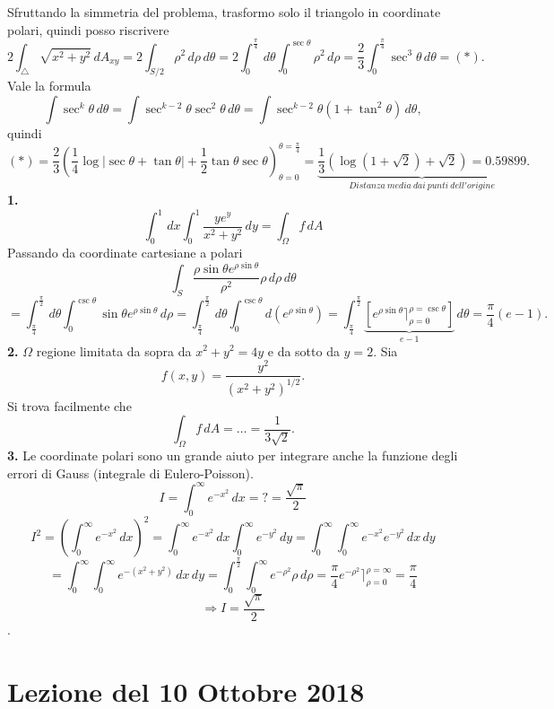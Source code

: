 \documentclass[10pt]{article}
\theoremstyle{plain}
\theoremstyle{definition}
\begin{document}
Sfruttando la simmetria del problema, trasformo solo il triangolo in coordinate polari, quindi posso riscrivere
$$2\int_{\triangle} \sqrt{x^2+y^2} \,dA_{xy} = 2\int_{S/2} \rho^2 \,d\rho \,d\theta = 2\int_0^{\frac{\pi}{4}} \,d\theta \int_0^{\sec \theta} \rho^2 \,d\rho = \frac{2}{3} \int_0^{\frac{\pi}{4}} \sec^3 \theta \,d\theta = (*).$$
Vale la formula
$$\int \sec^k \theta \,d \theta = \int \sec^{k-2}\theta \sec^2 \theta \,d\theta = \int \sec^{k-2} \theta (1+\tan^2 \theta) \,d \theta,$$
quindi
$$(*)= \frac{2}{3} \left( \frac{1}{4} \log|\sec\theta+\tan\theta|+\frac{1}{2} \tan\theta\sec\theta \right)_{\theta=0}^{\theta=\frac{\pi}{4}} = \underbrace{\frac{1}{3} (\log(1+\sqrt{2})+\sqrt{2}) = 0.59899}_{Distanza\ media\ dai\ punti\ dell'origine}.$$
\bigskip
\textbf{1.}
$$\int_0^1 \,dx \int_0^1 \frac{ye^y}{x^2+y^2} \,dy =\int_{\Omega} f \,dA $$
Passando da coordinate cartesiane a polari
$$\int_S \frac{\rho \sin\theta e^{\rho\sin\theta}}{\rho^2}\rho \,d\rho \,d\theta $$
$$= \int_{\frac{\pi}{4}}^{\frac{\pi}{2}}\,d\theta \int_0^{\csc\theta} \sin\theta e^{\rho\sin\theta}\,d\rho = \int_{\frac{\pi}{4}}^{\frac{\pi}{2}} \,d\theta \int_0^{\csc\theta} d(e^{\rho\sin\theta}) = \int_{\frac{\pi}{4}}^{\frac{\pi}{2}} \underbrace{\left[ e^{\rho\sin\theta}\rceil_{\rho=0}^{\rho=\csc\theta}\right]}_{e-1} \,d\theta = \frac{\pi}{4}(e-1).$$
\textbf{2.}\newline
$\Omega$ regione limitata da sopra da $x^2+y^2=4y$ e da sotto da $y=2$. Sia $$f(x,y) = \frac{y^2}{(x^2+y^2)^{1/2}}.$$
Si trova facilmente che
$$\int_{\Omega}f \,dA = \dots = \frac{1}{3\sqrt{2}}.$$
\bigskip
\textbf{3.}\newline
Le coordinate polari sono un grande aiuto per integrare anche la funzione degli errori di Gauss (integrale di Eulero-Poisson).
$$I = \int_0^{\infty} e^{-x^2} \,dx = ? = \frac{\sqrt{\pi}}{2}$$
$$I^2 = \left( \int_0^{\infty} e^{-x^2} \,dx \right)^2 = \int_0^{\infty} e^{-x^2} \,dx \int_0^{\infty} e^{-y^2} \,dy = \int_0^{\infty} \int_0^{\infty} e^{-x^2} e^{-y^2} \,dx \,dy $$ $$= \int_0^{\infty} \int_0^{\infty} e^{-(x^2+y^2)} \,dx \,dy = \int_0^{\frac{\pi}{2}} \int_0^{\infty} e^{-\rho^2} \rho \,d\rho = \frac{\pi}{4} e^{-\rho^2} \rceil_{\rho=0}^{\rho=\infty} = \frac{\pi}{4} $$ $$ \Rightarrow I=\frac{\sqrt{\pi}}{2}$$.

\section{Lezione del 10 Ottobre 2018}
\end{document}
